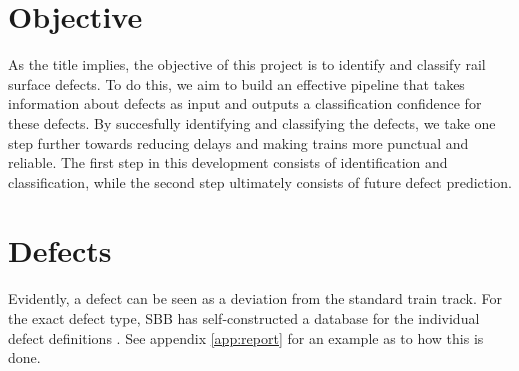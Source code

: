 \section{Objective}
As the title implies, the objective of this project is to identify and classify rail surface defects. To do this, we aim to build an effective pipeline that takes information about defects as input and outputs a classification confidence for these defects. By succesfully identifying and classifying the defects, we take one step further towards reducing delays and making trains more punctual and reliable. The first step in this development consists of identification and classification, while the second step ultimately consists of future defect prediction.

\section{Defects}
Evidently, a defect can be seen as a deviation from the standard train track. For the exact defect type, SBB has self-constructed a database for the individual defect definitions . See appendix \ref{app:report} for an example as to how this is done.


